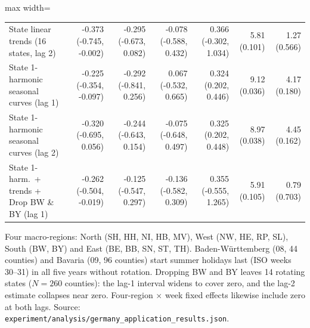 \begin{table}[!t]
\begin{adjustbox}{max width=\linewidth}
\begin{tabular}{lrrrrrr}
State linear trends (16 states, lag 2) & -0.373 (-0.745, -0.002) & -0.295 (-0.673, 0.082) & -0.078 (-0.588, 0.432) & 0.366 (-0.302, 1.034) & 5.81 (0.101) & 1.27 (0.566) \\
State 1-harmonic seasonal curves (lag 1) & -0.225 (-0.354, -0.097) & -0.292 (-0.841, 0.256) & 0.067 (-0.532, 0.665) & 0.324 (0.202, 0.446) & 9.12 (0.036) & 4.17 (0.180) \\
State 1-harmonic seasonal curves (lag 2) & -0.320 (-0.695, 0.056) & -0.244 (-0.643, 0.154) & -0.075 (-0.648, 0.497) & 0.325 (0.202, 0.448) & 8.97 (0.038) & 4.45 (0.162) \\
State 1-harm.\ + trends + Drop BW \& BY (lag 1) & -0.262 (-0.504, -0.019) & -0.125 (-0.547, 0.297) & -0.136 (-0.582, 0.309) & 0.355 (-0.555, 1.265) & 5.91 (0.105) & 0.79 (0.703) \\
\bottomrule
\end{tabular}
\end{adjustbox}
\par\smallskip\parbox{\linewidth}{\scriptsize Four macro-regions: North (SH, HH, NI, HB, MV), West (NW, HE, RP, SL), South (BW, BY) and East (BE, BB, SN, ST, TH). Baden-W\"urttemberg (08, 44 counties) and Bavaria (09, 96 counties) start summer holidays last (ISO weeks 30--31) in all five years without rotation. Dropping BW and BY leaves 14 rotating states ($N=260$ counties): the lag-1 interval widens to cover zero, and the lag-2 estimate collapses near zero. Four-region $\times$ week fixed effects likewise include zero at both lags. Source: \texttt{experiment/analysis/germany\_application\_results.json}.}
\end{table}
